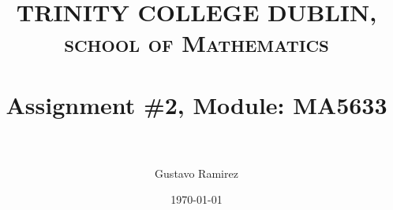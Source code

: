 \documentclass[paper=a4, fontsize=11pt]{scrartcl} %
\title{	
\normalfont \normalsize 
\textsc{TRINITY COLLEGE DUBLIN, school of Mathematics} \\ [25pt] %
\horrule{0.5pt} \\[0.4cm] %
\huge Assignment \#2, Module: MA5633 \\ %
\horrule{2pt} \\[0.5cm] %
}
\author{Gustavo Ramirez} %
\date{\normalsize\today} %
\numberwithin{equation}{section} %
\numberwithin{figure}{section} %
\numberwithin{table}{section} %
\begin{document}
\maketitle %


\begin{comment}
\section{Part 2 of assignment: interpolation by splines}

A brief presentation is made here, of all the mathematical tools needed to implement the natural and complete spline approximations, in the general case.
\end{comment}

\begin{comment}
\begin{enumerate}
\item Write a C program that multiplies two matrices. The sizes of the matrices should again be given to the program as command line arguments and be filled with values from a random number generator.
\item Use the gettimeofday() function (or some other appropriate timing routine) to measure the time taken to calculate the matrix product for various sizes of matrices. Plot a graph of your timings using gnuplot and generate a PostScript file with the graph. What conclusions, if any, can you draw about the performance of your code.
\item Play around with various compiler options for optimizing the execution of your code. Compare the performance against the unoptimized (-O0) version timed in Task 2. Which combination of flags gives the best performance?
\item (bonus marks) Read about the BLAS library and see if you can modify your code to use this library to get better performance. You will want to look at the DGEMM function.
\end{enumerate}
\end{comment}

\newpage
\end{document}
